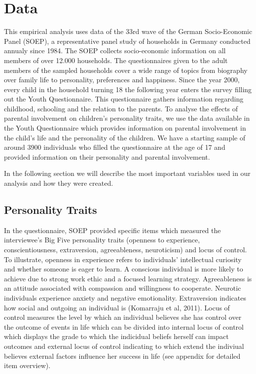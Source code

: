 \documentclass[%
    a4paper,            %
    11pt,               %
    bibliography=totoc, %
]
{scrartcl}
\begin{document}
\section{Data}
This empirical analysis uses data of the 33rd wave of the German Socio-Economic Panel (SOEP), a representative panel study of households in Germany conducted annualy since 1984. The SOEP collects socio-economic information on all members of over 12.000 households. The questionnaires given to the adult members of the sampled households cover a wide range of topics from biography over family life to personality, preferences and happiness. Since the year 2000, every child in the household turning 18 the following year enters the survey filling out the Youth Questionnaire. This questionnaire gathers information regarding childhood, schooling and the relation to the parents. \newline
To analyse the effects of parental involvement on children's personality traits, we use the data available in the Youth Questionnaire which provides information on  parental involvement in the child’s life and the personality of the children. We have a starting sample of around 3900 individuals who filled the questionnaire at the age of 17 and provided information on their personality and parental involvement. \newline

In the following section we will describe the most important variables used in our analysis and how they were created.

\subsection{Personality Traits}

In the questionnaire, SOEP provided specific items which measured the interviewee’s Big Five personality traits (openness to experience, conscientiousness, extraversion, agreeableness, neuroticism) and locus of control. 
To illustrate, openness in experience refers to individuals' intellectual curiosity and whether someone is eager to learn. A conscious individual is more likely to achieve due to strong work ethic and a focused learning strategy. Agreeableness is an attitude associated with compassion and willingness to cooperate. Neurotic individuals experience anxiety and negative emotionality. Extraversion indicates how social and outgoing an individual is (Komarraju et al, 2011). Locus of control measures the level by which an individual believes she has control over the outcome of events in life which can be divided into internal locus of control which displays the grade to which the indicidual beliefs herself can impact outcomes and external locus of control indicating to which extend the indiviual believes external factors influence her success in life (see appendix for detailed item overview).\newline
\end{document}
